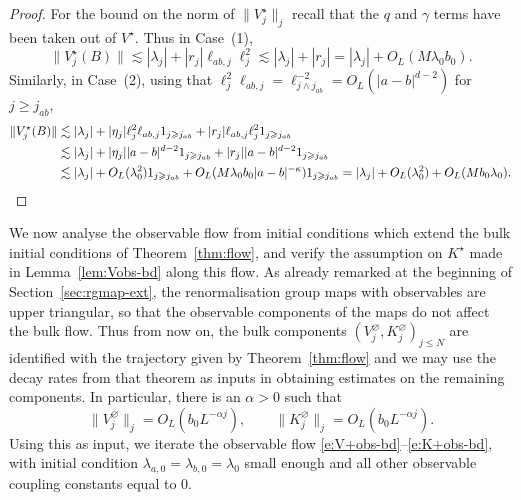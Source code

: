 \documentclass[11pt]{amsart}
\numberwithin{equation}{section}
\numberwithin{theorem}{section}
\newcommand{\1}{{\bf 1}}
\newcommand{\obs}{\star}
\newcommand{\Vbulk}{V^\varnothing}
\newcommand{\Vobs}{V^\obs}
\newcommand{\Kbulk}{K^\varnothing}
\newcommand{\Kobs}{K^\obs}
\newcommand{\ellabj}{\ell_{ab,j}}
\newcommand{\OL}{O_L}
\begin{document}
\begin{proof}
  For the bound on the norm of $\|\Vobs_{j}\|_j$ recall that the $q$
  and $\gamma$ terms have been taken out of $\Vobs$. Thus in Case~(1),
  \begin{equation}
    \|\Vobs_j(B)\|
    \lesssim |\lambda_j|  + |r_j|\ellabj\ell_j^2 
    \lesssim |\lambda_j|  + |r_j| 
    = |\lambda_j| + \OL(M\lambda_0b_0)
    .
  \end{equation}
  Similarly, in Case~(2), using that $\ell_j^2\ellabj = \ell_{j\wedge j_{ab}}^{-2} = \OL(|a-b|^{d-2})$ for $j \geq j_{ab}$,
  \begin{align}
    \|\Vobs_j(B)\|
    &\lesssim |\lambda_j| + |\eta_j| \ell_j^2\ellabj 1_{j\geq j_{ab}} +|r_{j}| \ellabj\ell_j^2 1_{j\geq j_{ab}}
      \nnb
    &\lesssim |\lambda_j| + |\eta_j||a-b|^{d-2}1_{j\geq j_{ab}} + |r_{j}| |a-b|^{d-2}1_{j\geq j_{ab}}
      \nnb
    &\lesssim |\lambda_j| + \OL(\lambda_0^2)1_{j\geq j_{ab}} +\OL(M\lambda_0b_0 |a-b|^{-\kappa})1_{j \geq j_{ab}} = |\lambda_j|+\OL(\lambda_0^2)+\OL(M b_0\lambda_0).\qedhere
  \end{align}
\end{proof}
\medskip

We now analyse the observable flow from initial conditions which extend the bulk initial conditions  of Theorem~\ref{thm:flow},
and verify the assumption on $\Kobs$ made in Lemma~\ref{lem:Vobs-bd} along this flow.
As already remarked at the beginning of Section~\ref{sec:rgmap-ext}, the renormalisation group maps with observables are upper triangular,
so that the observable components of the maps do not affect the bulk flow.
Thus from now on, the bulk components $(V_j^\varnothing,K_j^\varnothing)_{j \leq N}$ are identified with the trajectory
given by Theorem~\ref{thm:flow} and we may use the decay rates from that theorem as inputs in obtaining estimates on the remaining components.
In particular, there is an $\alpha>0$ such that
\begin{equation}
  \label{e:flowVK-bis}
  \|\Vbulk_j\|_j = \OL(b_0L^{-\alpha j}), \qquad 
  \|\Kbulk_j\|_j = \OL(b_0L^{-\alpha j}).
\end{equation}
Using this as input,
we iterate the observable flow \eqref{e:V+obs-bd}--\eqref{e:K+obs-bd},
with initial condition $\lambda_{a,0}=\lambda_{b,0}=\lambda_0$ small enough
and all other observable coupling constants equal to $0$.
\end{document}
